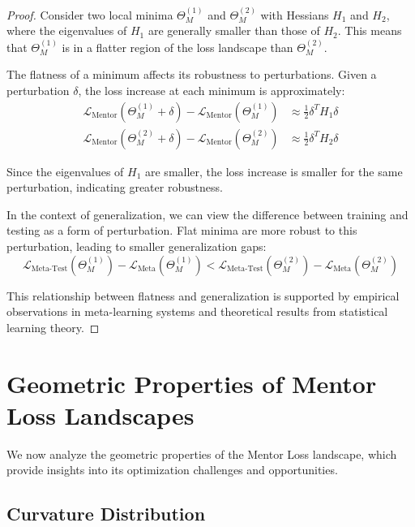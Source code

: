 \begin{proof}
Consider two local minima $\Theta_M^{(1)}$ and $\Theta_M^{(2)}$ with Hessians $H_1$ and $H_2$, where the eigenvalues of $H_1$ are generally smaller than those of $H_2$. This means that $\Theta_M^{(1)}$ is in a flatter region of the loss landscape than $\Theta_M^{(2)}$.

The flatness of a minimum affects its robustness to perturbations. Given a perturbation $\delta$, the loss increase at each minimum is approximately:
\begin{align}
\mathcal{L}_{\text{Mentor}}(\Theta_M^{(1)} + \delta) - \mathcal{L}_{\text{Mentor}}(\Theta_M^{(1)}) &\approx \frac{1}{2}\delta^T H_1 \delta \\
\mathcal{L}_{\text{Mentor}}(\Theta_M^{(2)} + \delta) - \mathcal{L}_{\text{Mentor}}(\Theta_M^{(2)}) &\approx \frac{1}{2}\delta^T H_2 \delta
\end{align}

Since the eigenvalues of $H_1$ are smaller, the loss increase is smaller for the same perturbation, indicating greater robustness.

In the context of generalization, we can view the difference between training and testing as a form of perturbation. Flat minima are more robust to this perturbation, leading to smaller generalization gaps:
\begin{equation}
\mathcal{L}_{\text{Meta-Test}}(\Theta_M^{(1)}) - \mathcal{L}_{\text{Meta}}(\Theta_M^{(1)}) < \mathcal{L}_{\text{Meta-Test}}(\Theta_M^{(2)}) - \mathcal{L}_{\text{Meta}}(\Theta_M^{(2)})
\end{equation}

This relationship between flatness and generalization is supported by empirical observations in meta-learning systems and theoretical results from statistical learning theory.
\end{proof}

\section{Geometric Properties of Mentor Loss Landscapes}

We now analyze the geometric properties of the Mentor Loss landscape, which provide insights into its optimization challenges and opportunities.

\subsection{Curvature Distribution}

